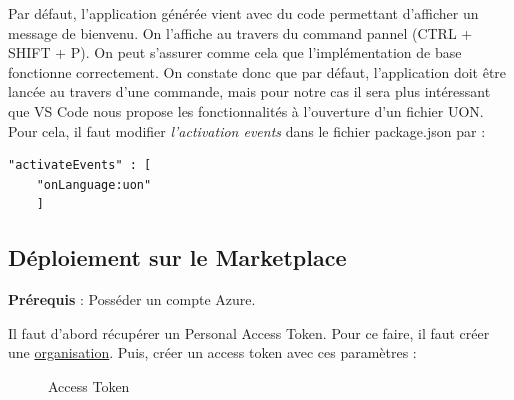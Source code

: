 \documentclass[
    iict, %
    il, %
]{heig-tb}
\begin{document}
Par défaut, l'application générée vient avec du code permettant d'afficher un message de bienvenu. On l'affiche au travers du command pannel (CTRL + SHIFT + P). On peut s'assurer comme cela que l'implémentation de base fonctionne correctement.
On constate donc que par défaut, l'application doit être lancée au travers d'une commande, mais pour notre cas il sera plus intéressant que VS Code nous propose les fonctionnalités à l'ouverture d'un fichier UON.
Pour cela, il faut modifier \emph{l'activation events} dans le fichier package.json par :
\begin{lstlisting}[frame=single]
    "activateEvents" : [
	"onLanguage:uon"
    ]
\end{lstlisting}

\subsection{Déploiement sur le Marketplace}


\textbf{Prérequis} : Posséder un compte Azure.

Il faut d'abord récupérer un Personal Access Token. Pour ce faire, il faut créer une \href{https://docs.microsoft.com/en-us/azure/devops/organizations/accounts/create-organization?view=azure-devops}{organisation}.
Puis, créer un access token avec ces paramètres :
\begin{figure}[!h]
    \begin{center}
    \end{center}
    \caption[Access Token]{\label{access-token}Access Token}
\end{figure}
\end{document}
